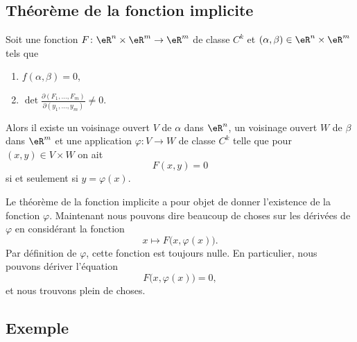 \subsection{Théorème de la fonction implicite}

\begin{theorem}  \label{ThoAcaWho}
    Soit une fonction \( F\colon \eR^n\times \eR^m\to \eR^m\) de classe \( C^k\) et \( (\alpha,\beta)\in \eR^n\times \eR^m\) tels que
    \begin{enumerate}
        \item
            \( f(\alpha,\beta)=0\),
        \item
            $\det\frac{ \partial (F_1,\ldots, F_m) }{ \partial (y_1,\ldots, y_m) }\neq 0$.
    \end{enumerate}
    Alors il existe un voisinage ouvert \( V\) de \( \alpha\) dans \( \eR^n\), un voisinage ouvert \( W\) de \( \beta\) dans \( \eR^m\) et une application \( \varphi\colon V\to W\) de classe \( C^k\)  telle que pour \( (x,y)\in V\times W\) on ait
    \begin{equation}
        F(x,y)=0
    \end{equation}
    si et seulement si \( y=\varphi(x)\).
\end{theorem}
	
Le théorème de la fonction implicite a pour objet de donner l'existence de la fonction $\varphi$. Maintenant nous pouvons dire beaucoup de choses sur les dérivées de $\varphi$ en considérant la fonction
\begin{equation}
	x\mapsto F\big( x,\varphi(x) \big).
\end{equation}
Par définition de $\varphi$, cette fonction est toujours nulle. En particulier, nous pouvons dériver l'équation
\begin{equation}
	F\big( x,\varphi(x) \big)=0,
\end{equation}
et nous trouvons plein de choses.

\subsection{Exemple}

